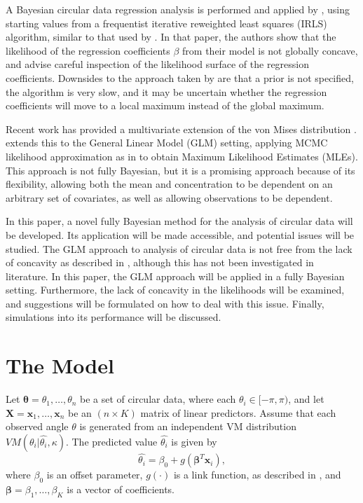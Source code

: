 \documentclass[12pt,a4paper]{article}\usepackage[]{graphicx}\usepackage[]{color}
\begin{document}
A Bayesian circular data regression analysis is performed and applied by \citet{gill2010}, using starting values from a frequentist iterative reweighted least squares (IRLS) algorithm, similar to that used by \citet{fisher1992regression}. In that paper, the authors show that the likelihood of the regression coefficients $\beta$ from their model is not globally concave, and advise careful inspection of the likelihood surface of the regression coefficients. Downsides to the approach taken by \citet{gill2010} are that a prior is not specified, the algorithm is very slow, and it may be uncertain whether the regression coefficients will move to a local maximum instead of the global maximum.

Recent work has provided a multivariate extension of the von Mises distribution \citep{mardia2008multivariate,mardia2014some}. \citet{lagona2014regression} extends this to the General Linear Model (GLM) setting, applying MCMC likelihood approximation as in \citet{geyer1992constrained} to obtain Maximum Likelihood Estimates (MLEs). This approach is not fully Bayesian, but it is a promising approach because of its flexibility, allowing both the mean and concentration to be dependent on an arbitrary set of covariates, as well as allowing observations to be dependent.

In this paper, a novel fully Bayesian method for the analysis of circular data will be developed. Its application will be made accessible, and potential issues will be studied. The GLM approach to analysis of circular data is not free from the lack of concavity as described in \citet{gill2010}, although this has not been investigated in literature. In this paper, the GLM approach will be applied in a fully Bayesian setting. Furthermore, the lack of concavity in the likelihoods will be examined, and suggestions will be formulated on how to deal with this issue. Finally, simulations into its performance will be discussed.

\section{The Model}

Let $\boldsymbol\theta = \theta_1, \dots, \theta_n$ be a set of circular data, where each $\theta_i \in [-\pi, \pi)$, and let $\boldsymbol{X} = \boldsymbol{x}_1, \dots, \boldsymbol{x}_n$ be an $(n \times K)$ matrix of linear predictors. Assume that each observed angle $\theta$ is generated from an independent VM distribution $ VM(\theta_i \vert \hat{\theta_i}, \kappa)$. The predicted value $\hat{\theta_i}$ is given by
\begin{equation}
\hat{\theta_i} = \beta_0 + g(\boldsymbol\beta^T \boldsymbol{x}_i),
\end{equation}
where $\beta_0$ is an offset parameter, $g(\cdot)$ is a link function, as described in \citet{fisher1992regression}, and $\boldsymbol{\beta} = \beta_1, \dots, \beta_K$ is a vector of coefficients.
\end{document}
